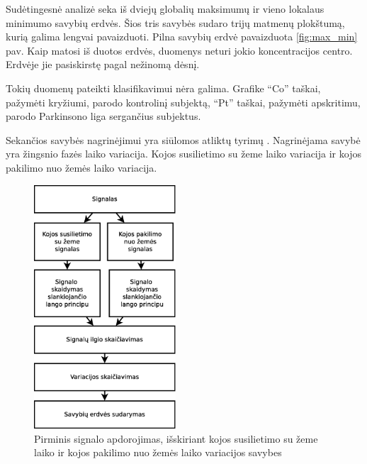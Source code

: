 \documentclass[]{vgtuef}
\begin{document}
Sudėtingesnė analizė seka iš dviejų globalių maksimumų ir vieno lokalaus minimumo savybių erdvės. Šios tris savybės sudaro trijų matmenų plokštumą, kurią galima lengvai pavaizduoti. Pilna savybių erdvė pavaizduota \ref{fig:max_min} pav. Kaip matosi iš duotos erdvės, duomenys neturi jokio koncentracijos centro. Erdvėje jie pasiskirstę pagal nežinomą dėsnį.

Tokių duomenų pateikti klasifikavimui nėra galima. Grafike ``Co'' taškai, pažymėti kryžiumi, parodo kontrolinį subjektą, ``Pt'' taškai, pažymėti apskritimu, parodo Parkinsono liga sergančius subjektus.

Sekančios savybės nagrinėjimui yra siūlomos atliktų tyrimų \cite{16053531,KNUTSSON01011972,Delval_Salleron_Bourriez_Bleuse_Moreau_Krystkowiak_Defebvre_Devos_Duhamel_2008}. Nagrinėjama savybė yra žingsnio fazės laiko variacija. Kojos susilietimo su žeme laiko variacija ir kojos pakilimo nuo žemės laiko variacija.

\begin{figure}[!t]
  \centering
  \includegraphics[width=200px]{figures/pirminis_signalo_apdorojimas_skaiciuojant_variacija.eps}
  \caption{Pirminis signalo apdorojimas, išskiriant kojos susilietimo su žeme laiko ir kojos pakilimo nuo žemės laiko variacijos savybes}
  \label{fig:stance_swing_extract}
\end{figure}
\end{document}
